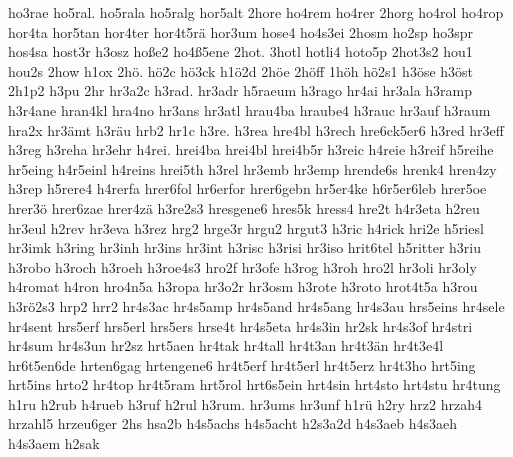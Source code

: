 {    ho3rae
    ho5ral.
    ho5rala
    ho5ralg
    hor5alt
    2hore
    ho4rem
    ho4rer
    2horg
    ho4rol
    ho4rop
    hor4ta
    hor5tan
    hor4ter
    hor4t5rä
    hor3um
    hose4
    ho4s3ei
    2hosm
    ho2sp
    ho3spr
    hos4sa
    host3r
    h3osz
    hoße2
    ho4ß5ene
    2hot.
    3hotl
    hotli4
    hoto5p
    2hot3s2
    hou1
    hou2s
    2how
    h1ox
    2hö.
    hö2c
    hö3ck
    h1ö2d
    2höe
    2höff
    1höh
    hö2s1
    h3öse
    h3öst
    2h1p2
    h3pu
    2hr
    hr3a2c
    h3rad.
    hr3adr
    h5raeum
    h3rago
    hr4ai
    hr3ala
    h3ramp
    h3r4ane
    hran4kl
    hra4no
    hr3ans
    hr3atl
    hrau4ba
    hraube4
    h3rauc
    hr3auf
    h3raum
    hra2x
    hr3ämt
    h3räu
    hrb2
    hr1c
    h3re.
    h3rea
    hre4bl
    h3rech
    hre6ck5er6
    h3red
    hr3eff
    h3reg
    h3reha
    hr3ehr
    h4rei.
    hrei4ba
    hrei4bl
    hrei4b5r
    h3reic
    h4reie
    h3reif
    h5reihe
    hr5eing
    h4r5einl
    h4reins
    hrei5th
    h3rel
    hr3emb
    hr3emp
    hrende6s
    hrenk4
    hren4zy
    h3rep
    h5rere4
    h4rerfa
    hrer6fol
    hr6erfor
    hrer6gebn
    hr5er4ke
    h6r5er6leb
    hrer5oe
    hrer3ö
    hrer6zae
    hrer4zä
    h3re2s3
    hresgene6
    hres5k
    hress4
    hre2t
    h4r3eta
    h2reu
    hr3eul
    h2rev
    hr3eva
    h3rez
    hrg2
    hrge3r
    hrgu2
    hrgut3
    h3ric
    h4rick
    hri2e
    h5riesl
    hr3imk
    h3ring
    hr3inh
    hr3ins
    hr3int
    h3risc
    h3risi
    hr3iso
    hrit6tel
    h5ritter
    h3riu
    h3robo
    h3roch
    h3roeh
    h3roe4s3
    hro2f
    hr3ofe
    h3rog
    h3roh
    hro2l
    hr3oli
    hr3oly
    h4romat
    h4ron
    hro4n5a
    h3ropa
    hr3o2r
    hr3osm
    h3rote
    h3roto
    hrot4t5a
    h3rou
    h3rö2s3
    hrp2
    hrr2
    hr4s3ac
    hr4s5amp
    hr4s5and
    hr4s5ang
    hr4s3au
    hrs5eins
    hr4sele
    hr4sent
    hrs5erf
    hrs5erl
    hrs5ers
    hrse4t
    hr4s5eta
    hr4s3in
    hr2sk
    hr4s3of
    hr4stri
    hr4sum
    hr4s3un
    hr2sz
    hrt5aen
    hr4tak
    hr4tall
    hr4t3an
    hr4t3än
    hr4t3e4l
    hr6t5en6de
    hrten6gag
    hrtengene6
    hr4t5erf
    hr4t5erl
    hr4t5erz
    hr4t3ho
    hrt5ing
    hrt5ins
    hrto2
    hr4top
    hr4t5ram
    hrt5rol
    hrt6s5ein
    hrt4sin
    hrt4sto
    hrt4stu
    hr4tung
    h1ru
    h2rub
    h4rueb
    h3ruf
    h2rul
    h3rum.
    hr3ums
    hr3unf
    h1rü
    h2ry
    hrz2
    hrzah4
    hrzahl5
    hrzeu6ger
    2hs
    hsa2b
    h4s5achs
    h4s5acht
    h2s3a2d
    h4s3aeb
    h4s3aeh
    h4s3aem
    h2sak
}
